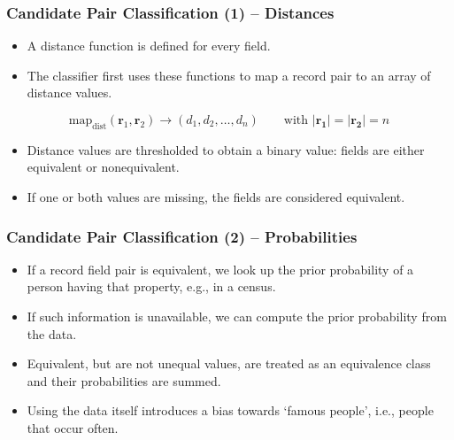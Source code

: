 \documentclass[12pt]{beamer}
\theoremstyle{break}
\begin{document}


\begin{frame}
	\frametitle{Candidate Pair Classification (1) -- Distances}
	
	\begin{itemize}
		\item A distance function is defined for every field.
		\item The classifier first uses these functions to map a record pair to an array of distance values.
	\end{itemize}
	
	\vspace{-8mm}
	
	\begin{equation*}
		\mathrm{map}_{\mathrm{dist}}(\bm{r}_1, \bm{r}_2) \to (d_1, d_2, \ldots, d_n)	 \qquad \text{with } \left\vert \bm{r_1} \right\vert = \left\vert \bm{r_2} \right\vert = n
	\end{equation*}
	
	\pause
	
	\begin{itemize}
		\item Distance values are thresholded to obtain a binary value: fields are either \alert{equivalent} or \alert{nonequivalent}.
		\item If one or both values are missing, the fields are considered equivalent.
	\end{itemize}

\end{frame}




\begin{frame}
	\frametitle{Candidate Pair Classification (2) -- Probabilities}
	
	\begin{itemize}
		\item If a record field pair is equivalent, we look up the \alert{prior probability} of a person having that property, e.g., in a census.
		\item If such information is unavailable, we can compute the prior probability from the data.
		\item Equivalent, but are not unequal values, are treated as an \alert{equivalence class} and their probabilities are summed.
		\item Using the data itself introduces a bias towards `famous people', i.e., people that occur often.
	\end{itemize}

\end{frame}
\end{document}
